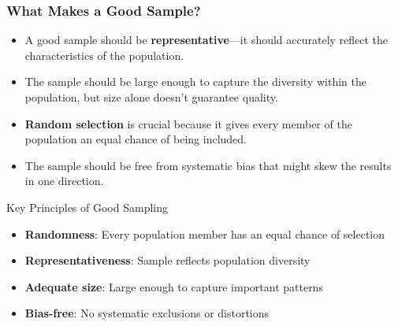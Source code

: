 \documentclass{beamer}
\begin{document}
	\begin{frame}
		\frametitle{What Makes a Good Sample?}
		
		\begin{itemize}
			\item A good sample should be \textbf{representative}—it should accurately reflect the characteristics of the population.
			\item The sample should be large enough to capture the diversity within the population, but size alone doesn't guarantee quality.
			\item \textbf{Random selection} is crucial because it gives every member of the population an equal chance of being included.
			\item The sample should be free from systematic bias that might skew the results in one direction.
		\end{itemize}
		
		\begin{block}{Key Principles of Good Sampling}
			\begin{itemize}
				\item \textbf{Randomness}: Every population member has an equal chance of selection
				\item \textbf{Representativeness}: Sample reflects population diversity
				\item \textbf{Adequate size}: Large enough to capture important patterns
				\item \textbf{Bias-free}: No systematic exclusions or distortions
			\end{itemize}
		\end{block}
		
	\end{frame}
	
\end{document}
